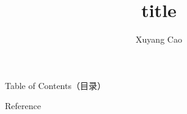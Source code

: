\documentclass[t,15pt]{beamer}
\title{title}
\author{Xuyang Cao}
\date{}
\begin{document}
\frame{\titlepage}                  


\begin{frame}{Table of Contents（目录）}    %
    \setcounter{tocdepth}{1}               %
    \tableofcontents                       %
\end{frame}



\begin{frame}{Reference}
    
    \small
\end{frame}
\end{document}
